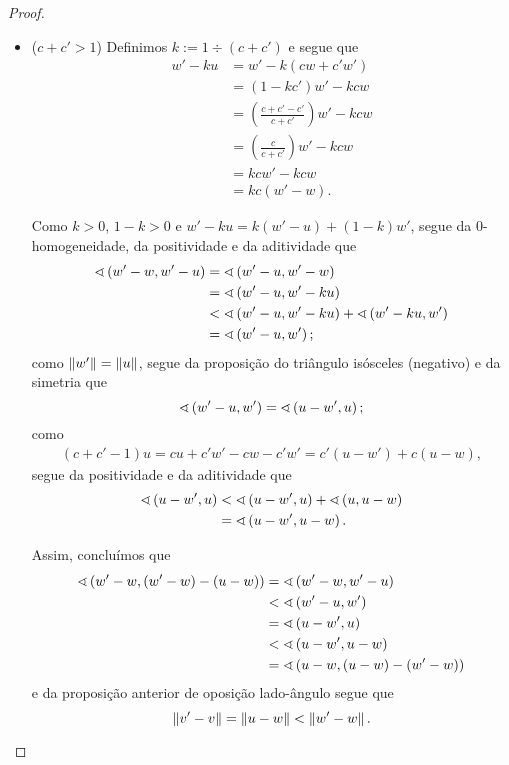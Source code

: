 \begin{proof}
\begin{enumerate}
\begin{itemize}
		\item ($c+c' > 1$) Definimos $k := 1 \div (c+c')$ e segue que
			\begin{align*}
			w'-ku &= w'-k(cw+c'w') \\
				&= (1-kc')w'-kcw \\
				&= \left( \frac{c+c'-c'}{c+c'} \right)w'-kcw \\
				&= \left( \frac{c}{c+c'} \right)w'-kcw \\
				&= kcw'-kcw \\
				&= kc(w'-w).
			\end{align*}
		
		Como $k>0$, $1-k>0$ e $w'-ku = k(w'-u) + (1-k)w'$, segue da $0$-homogeneidade, da positividade e da aditividade que
			\begin{align*}
			\sphericalangle\left({w'-w},{w'-u}\right) &= \sphericalangle\left({w'-u},{w'-w}\right) \\
				&= \sphericalangle\left({w'-u},{w'-ku}\right) \\
				&< \sphericalangle\left({w'-u},{w'-ku}\right) + \sphericalangle\left({w'-ku},{w'}\right) \\
				&= \sphericalangle\left({w'-u},{w'}\right);
			\end{align*}
		como $\left\Vert{w'}\right\Vert=\left\Vert{u}\right\Vert$, segue da proposição do triângulo isósceles (negativo) e da simetria que
			\begin{equation*}
			\sphericalangle\left({w'-u},{w'}\right) = \sphericalangle\left({u-w'},{u}\right);
			\end{equation*}
		como
			\begin{align*}
			(c+c'-1)u = cu+c'w'-cw-c'w' = c'(u-w')+c(u-w),
			\end{align*}
		segue da positividade e da aditividade que
			\begin{align*}
			\sphericalangle\left({u-w'},{u}\right) &< \sphericalangle\left({u-w'},{u}\right) + \sphericalangle\left({u},{u-w}\right) \\
				&= \sphericalangle\left({u-w'},{u-w}\right).
			\end{align*}
		
		Assim, concluímos que
			\begin{align*}
			\sphericalangle\left({w'-w},{(w'-w)-(u-w)}\right) &= \sphericalangle\left({w'-w},{w'-u}\right) \\
				&< \sphericalangle\left({w'-u},{w'}\right) \\
				&= \sphericalangle\left({u-w'},{u}\right) \\
				&< \sphericalangle\left({u-w'},{u-w}\right) \\
				&= \sphericalangle\left({u-w},{(u-w)-(w'-w)}\right)
			\end{align*}
		e da proposição anterior de oposição lado-ângulo segue que
			\begin{equation*}
			\left\Vert{v'-v}\right\Vert = \left\Vert{u-w}\right\Vert < \left\Vert{w'-w}\right\Vert.
			\end{equation*}
		\end{itemize}

	\end{enumerate}
\end{proof}

